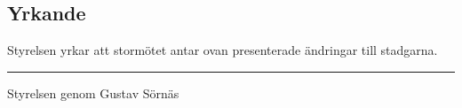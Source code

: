 \documentclass[12pt,a4paper]{article}
\begin{document}
\subsection{Yrkande}


Styrelsen yrkar att stormötet antar ovan presenterade ändringar till stadgarna.

\noindent\rule{\linewidth}{1pt}

Styrelsen genom Gustav Sörnäs
\end{document}
